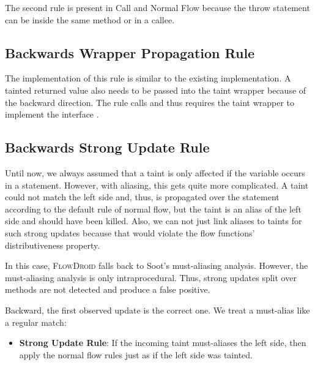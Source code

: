 \documentclass[../draft.tex]{subfiles}
\begin{document}
    The second rule is present in Call and Normal Flow because the throw statement can be inside the same method or in a callee.

    \subsection{Backwards Wrapper Propagation Rule}
    The implementation of this rule is similar to the existing implementation. A tainted returned value also needs to be passed into the taint wrapper because of the backward direction. The rule calls  and thus requires the taint wrapper to implement the  interface .


    \subsection{Backwards Strong Update Rule}
    Until now, we always assumed that a taint is only affected if the variable occurs in a statement. 
    However, with aliasing, this gets quite more complicated. 
    A taint could not match the left side and, thus, is propagated over the statement according to the default rule of normal flow, but the taint is an alias of the left side and should have been killed. 
    Also, we can not just link aliases to taints for such strong updates because that would violate the flow functions' distributiveness property.
    
    In this case, \textsc{FlowDroid} falls back to Soot's must-aliasing analysis. However, the must-aliasing analysis is only intraprocedural. Thus, strong updates split over methods are not detected and produce a false positive.
    
    Backward, the first observed update is the correct one. We treat a must-alias like a regular match:
    \begin{itemize}
        \item \textbf{Strong Update Rule}: If the incoming taint must-aliases the left side, then apply the normal flow rules just as if the left side was tainted. 
    \end{itemize}
\end{document}
